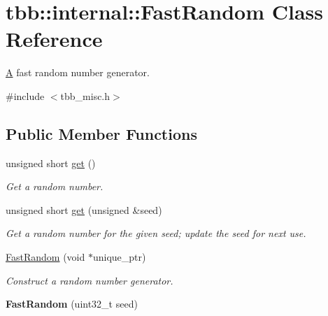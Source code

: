 \hypertarget{classtbb_1_1internal_1_1FastRandom}{}\section{tbb\+:\+:internal\+:\+:Fast\+Random Class Reference}
\label{classtbb_1_1internal_1_1FastRandom}


\hyperlink{structA}{A} fast random number generator.  




{\ttfamily \#include $<$tbb\+\_\+misc.\+h$>$}

\subsection*{Public Member Functions}
\begin{DoxyCompactItemize}
\item 
\hypertarget{classtbb_1_1internal_1_1FastRandom_ac8e049baba79d8277271decc591c0239}{}unsigned short \hyperlink{classtbb_1_1internal_1_1FastRandom_ac8e049baba79d8277271decc591c0239}{get} ()\label{classtbb_1_1internal_1_1FastRandom_ac8e049baba79d8277271decc591c0239}

\begin{DoxyCompactList}\small\item\em Get a random number. \end{DoxyCompactList}\item 
\hypertarget{classtbb_1_1internal_1_1FastRandom_affabfc8bd8cb1ca584154a82b17cfe01}{}unsigned short \hyperlink{classtbb_1_1internal_1_1FastRandom_affabfc8bd8cb1ca584154a82b17cfe01}{get} (unsigned \&seed)\label{classtbb_1_1internal_1_1FastRandom_affabfc8bd8cb1ca584154a82b17cfe01}

\begin{DoxyCompactList}\small\item\em Get a random number for the given seed; update the seed for next use. \end{DoxyCompactList}\item 
\hypertarget{classtbb_1_1internal_1_1FastRandom_aebf558f65d49a66b3d1834cd9e4a3ca2}{}\hyperlink{classtbb_1_1internal_1_1FastRandom_aebf558f65d49a66b3d1834cd9e4a3ca2}{Fast\+Random} (void $\ast$unique\+\_\+ptr)\label{classtbb_1_1internal_1_1FastRandom_aebf558f65d49a66b3d1834cd9e4a3ca2}

\begin{DoxyCompactList}\small\item\em Construct a random number generator. \end{DoxyCompactList}\item 
\hypertarget{classtbb_1_1internal_1_1FastRandom_ac5068c7c1cd5241295b951f7cfb37fe4}{}{\bfseries Fast\+Random} (uint32\+\_\+t seed)\label{classtbb_1_1internal_1_1FastRandom_ac5068c7c1cd5241295b951f7cfb37fe4}


\end{DoxyCompactItemize}
